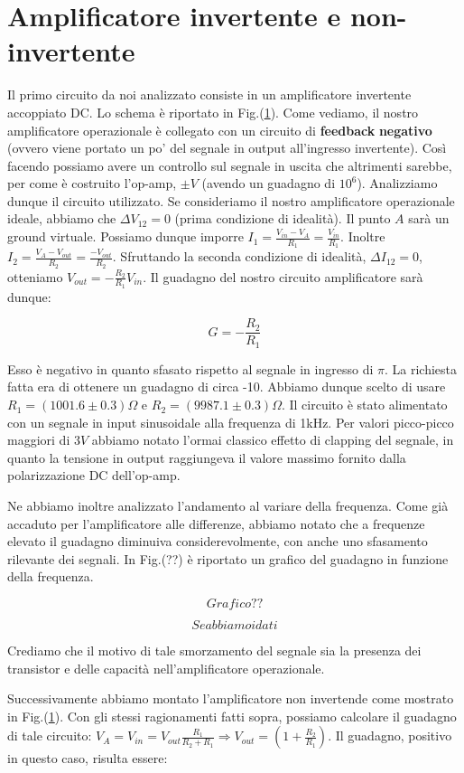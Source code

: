 \section{Amplificatore invertente e non-invertente}
Il primo circuito da noi analizzato consiste in un amplificatore invertente accoppiato DC. Lo schema è riportato in Fig.(\ref{}). Come vediamo, il nostro amplificatore operazionale è collegato con un circuito di \textbf{feedback} \textbf{negativo} (ovvero viene portato un po' del segnale in output all'ingresso invertente). Così facendo possiamo avere un controllo sul segnale in uscita che altrimenti sarebbe, per come è costruito l'op-amp, $\pm V$ (avendo un guadagno di $10^6$). Analizziamo dunque il circuito utilizzato. Se consideriamo il nostro amplificatore operazionale ideale, abbiamo che $\Delta V_{12}=0$ (prima condizione di idealità). Il punto $A$ sarà un ground virtuale. Possiamo dunque imporre $I_1=\frac{V_{in}-V_A}{R_1}=\frac{V_{in}}{R_1}$.  Inoltre $I_2=\frac{V_A-V_{out}}{R_2}=\frac{-V_{out}}{R_2}$.
Sfruttando la seconda condizione di idealità, $\Delta I_{12}=0$, otteniamo $V_{out}=-\frac{R_2}{R_1} V_{in}$. Il guadagno del nostro circuito amplificatore sarà dunque:

$$G=-\frac{R_2}{R_1}$$


Esso è negativo in quanto sfasato rispetto al segnale in ingresso di $\pi$.
La richiesta fatta era di ottenere un guadagno di circa -10. Abbiamo dunque scelto di usare $R_1=(1001.6\pm0.3)\Omega$ e $R_2=(9987.1\pm0.3)\Omega$. Il circuito è stato alimentato con un segnale in input sinusoidale alla frequenza di 1kHz. Per valori picco-picco maggiori di $3V$ abbiamo notato l'ormai classico effetto di clapping del segnale, in quanto la tensione in output raggiungeva il valore massimo fornito dalla polarizzazione DC dell'op-amp. 

Ne abbiamo inoltre analizzato l'andamento al variare della frequenza. Come già accaduto per l'amplificatore alle differenze, abbiamo notato che a frequenze elevato il guadagno diminuiva considerevolmente, con anche uno sfasamento rilevante dei segnali. In Fig.(??) è riportato un grafico del guadagno in funzione della frequenza. 

$$Grafico??$$

$$Se abbiamo i dati$$


Crediamo che il motivo di tale smorzamento del segnale sia la presenza dei transistor e delle capacità nell'amplificatore operazionale.


Successivamente abbiamo montato l'amplificatore non invertende come mostrato in Fig.(\ref{}). Con gli stessi ragionamenti fatti sopra, possiamo calcolare il guadagno di tale circuito: $V_A=V_{in}=V_{out}\frac{R_1}{R_2+R_1} \Rightarrow V_{out}=(1+\frac{R_2}{R_1})$. Il guadagno, positivo in questo caso, risulta essere: 

